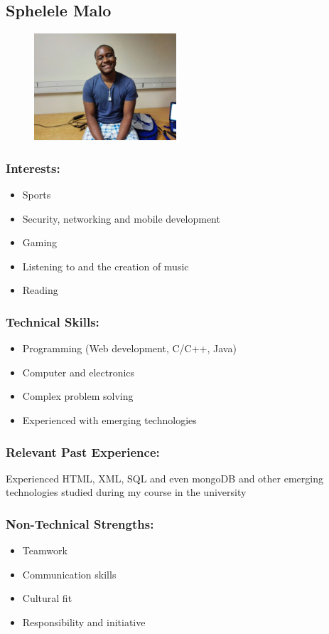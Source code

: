 \newpage
\subsection{Sphelele Malo}

\begin{figure}[h]
			\center
			\includegraphics[width=200px]{images/sphe.jpg}
\end{figure}
\subsubsection{Interests:}
	\begin{itemize}
		\item Sports
		\item Security, networking and mobile development
		\item Gaming
		\item Listening to and the creation of music 
		\item Reading 
	\end{itemize}
\subsubsection{Technical Skills:}
	\begin{itemize}
		\item Programming (Web development, C/C++, Java)
		\item Computer and electronics 
		\item Complex problem solving
		\item Experienced with emerging technologies 
	\end{itemize}
	
\subsubsection{Relevant Past Experience:}
\par{Experienced HTML, XML, SQL and even mongoDB and other emerging technologies studied during my course in the university
}
\subsubsection{Non-Technical Strengths:}
\begin{itemize}
		\item Teamwork
		\item Communication skills
		\item Cultural fit
		\item Responsibility and initiative
	\end{itemize}
